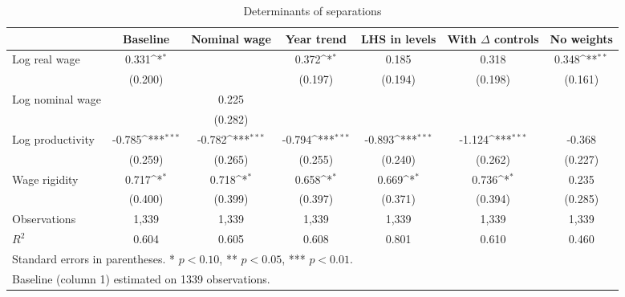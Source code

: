 \begin{table}[htbp]\centering
\def\sym#1{\ifmmode^{#1}\else\(^{#1}\)\fi}
\caption{Determinants of separations\label{tab:sep}}
\begin{tabular}{l*{6}{c}}
\toprule
                    &\multicolumn{1}{c}{Baseline}&\multicolumn{1}{c}{Nominal wage}&\multicolumn{1}{c}{Year trend}&\multicolumn{1}{c}{LHS in levels}&\multicolumn{1}{c}{With $\Delta$ controls}&\multicolumn{1}{c}{No weights}\\
\midrule
Log real wage       &       0.331\sym{*}  &                     &       0.372\sym{*}  &       0.185         &       0.318         &       0.348\sym{**} \\
                    &     (0.200)         &                     &     (0.197)         &     (0.194)         &     (0.198)         &     (0.161)         \\
Log nominal wage    &                     &       0.225         &                     &                     &                     &                     \\
                    &                     &     (0.282)         &                     &                     &                     &                     \\
Log productivity    &      -0.785\sym{***}&      -0.782\sym{***}&      -0.794\sym{***}&      -0.893\sym{***}&      -1.124\sym{***}&      -0.368         \\
                    &     (0.259)         &     (0.265)         &     (0.255)         &     (0.240)         &     (0.262)         &     (0.227)         \\
Wage rigidity       &       0.717\sym{*}  &       0.718\sym{*}  &       0.658\sym{*}  &       0.669\sym{*}  &       0.736\sym{*}  &       0.235         \\
                    &     (0.400)         &     (0.399)         &     (0.397)         &     (0.371)         &     (0.394)         &     (0.285)         \\
\midrule
Observations        &       1,339         &       1,339         &       1,339         &       1,339         &       1,339         &       1,339         \\
$R^2$               &       0.604         &       0.605         &       0.608         &       0.801         &       0.610         &       0.460         \\
\bottomrule
\multicolumn{7}{l}{\footnotesize Standard errors in parentheses. * $p<0.10$, ** $p<0.05$, *** $p<0.01$.}\\
\multicolumn{7}{l}{\footnotesize Baseline (column 1) estimated on 1339 observations.}\\
\end{tabular}
\end{table}
